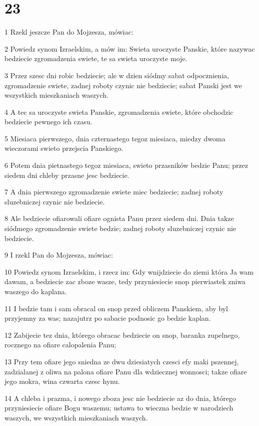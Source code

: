 \chapter{23}

\par 1 Rzekl jeszcze Pan do Mojzesza, mówiac:
\par 2 Powiedz synom Izraelskim, a mów im: Swieta uroczyste Panskie, które nazywac bedziecie zgromadzenia swiete, te sa swieta uroczyste moje.
\par 3 Przez szesc dni robic bedziecie; ale w dzien siódmy sabat odpocznienia, zgromadzenie swiete, zadnej roboty czynic nie bedziecie; sabat Panski jest we wszystkich mieszkaniach waszych.
\par 4 A tec sa uroczyste swieta Panskie, zgromadzenia swiete, które obchodzic bedziecie pewnego ich czasu.
\par 5 Miesiaca pierwszego, dnia czternastego tegoz miesiaca, miedzy dwoma wieczorami swieto przejscia Panskiego.
\par 6 Potem dnia pietnastego tegoz miesiaca, swieto przasników bedzie Panu; przez siedem dni chleby przasne jesc bedziecie.
\par 7 A dnia pierwszego zgromadzenie swiete miec bedziecie; zadnej roboty sluzebniczej czynic nie bedziecie.
\par 8 Ale bedziecie ofiarowali ofiare ognista Panu przez siedem dni. Dnia takze siódmego zgromadzenie swiete bedzie; zadnej roboty sluzebniczej czynic nie bedziecie.
\par 9 I rzekl Pan do Mojzesza, mówiac:
\par 10 Powiedz synom Izraelskim, i rzecz im: Gdy wnijdziecie do ziemi która Ja wam dawam, a bedziecie zac zboze wasze, tedy przyniesiecie snop pierwiastek zniwa waszego do kaplana.
\par 11 I bedzie tam i sam obracal on snop przed obliczem Panskiem, aby byl przyjemny za was; nazajutrz po sabacie podnosic go bedzie kaplan.
\par 12 Zabijecie tez dnia, którego obracac bedziecie on snop, baranka zupelnego, rocznego na ofiare calopalenia Panu;
\par 13 Przy tem ofiare jego sniedna ze dwu dziesiatych czesci efy maki pszennej, zadzialanej z oliwa na palona ofiare Panu dla wdziecznej wonnosci; takze ofiare jego mokra, wina czwarta czesc hynu.
\par 14 A chleba i prazma, i nowego zboza jesc nie bedziecie az do dnia, którego przyniesiecie ofiare Bogu waszemu; ustawa to wieczna bedzie w narodziech waszych, we wszystkich mieszkaniach waszych.
